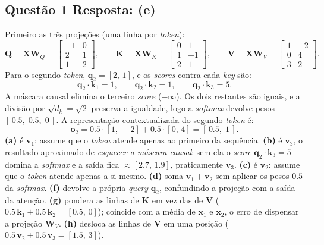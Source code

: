 \documentclass[11pt,a4paper]{article}
\begin{document}
\subsection*{Questão 1 \textemdash{} Resposta: (e)}
Primeiro as três projeções (uma linha por \textit{token}):
\[
\mathbf{Q} = \mathbf{X}\mathbf{W}_Q = \begin{bmatrix} -1 & 0 \\ 2 & 1 \\ 1 & 2 \end{bmatrix},
\qquad
\mathbf{K} = \mathbf{X}\mathbf{W}_K = \begin{bmatrix} 0 & 1 \\ 1 & -1 \\ 2 & 1 \end{bmatrix},
\qquad
\mathbf{V} = \mathbf{X}\mathbf{W}_V = \begin{bmatrix} 1 & -2 \\ 0 & 4 \\ 3 & 2 \end{bmatrix}.
\]
Para o segundo \textit{token}, $\mathbf{q}_2 = [2,\,1]$, e os \textit{scores} contra cada \textit{key} são:
\[
\mathbf{q}_2 \cdot \mathbf{k}_1 = 1, \qquad \mathbf{q}_2 \cdot \mathbf{k}_2 = 1, \qquad \mathbf{q}_2 \cdot \mathbf{k}_3 = 5.
\]
A máscara causal elimina o terceiro \textit{score} ($-\infty$). Os dois restantes são iguais, e a divisão por $\sqrt{d_k} = \sqrt{2}$ preserva a igualdade, logo a \textit{softmax} devolve pesos $[\,0.5,\;0.5,\;0\,]$. A representação contextualizada do segundo \textit{token} é:
\[
\mathbf{o}_2 = 0.5 \cdot [1,\,-2] + 0.5 \cdot [0,\,4] = [\,0.5,\;1\,].
\]
\textbf{(a)} é $\mathbf{v}_1$: assume que o \textit{token} atende apenas ao primeiro da sequência.
\textbf{(b)} é $\mathbf{v}_3$, o resultado aproximado de \emph{esquecer a máscara causal}: sem ela o \textit{score} $\mathbf{q}_2 \cdot \mathbf{k}_3 = 5$ domina a \textit{softmax} e a saída fica $\approx [2.7,\,1.9]$, praticamente $\mathbf{v}_3$.
\textbf{(c)} é $\mathbf{v}_2$: assume que o \textit{token} atende apenas a si mesmo.
\textbf{(d)} soma $\mathbf{v}_1 + \mathbf{v}_2$ sem aplicar os pesos $0.5$ da \textit{softmax}.
\textbf{(f)} devolve a própria \textit{query} $\mathbf{q}_2$, confundindo a projeção com a saída da atenção.
\textbf{(g)} pondera as linhas de $\mathbf{K}$ em vez das de $\mathbf{V}$ ($0.5\,\mathbf{k}_1 + 0.5\,\mathbf{k}_2 = [0.5,\,0]$); coincide com a média de $\mathbf{x}_1$ e $\mathbf{x}_2$, o erro de dispensar a projeção $\mathbf{W}_V$.
\textbf{(h)} desloca as linhas de $\mathbf{V}$ em uma posição ($0.5\,\mathbf{v}_2 + 0.5\,\mathbf{v}_3 = [1.5,\,3]$).
\end{document}
